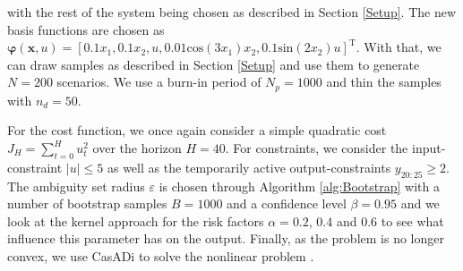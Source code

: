 with the rest of the system being chosen as described in Section \ref{Setup}. The new basis functions are chosen as $\boldsymbol{\varphi} (\boldsymbol{x}, u) = \left[0.1 x_1,  0.1 x_2,  u, 0.01 \text{cos} ( 3 x_1) x_2, 0.1 \text{sin} (2 x_2) u \right]^\text{T}$. With that, we can draw samples as described in Section \ref{Setup} and use them to generate $N = 200$ scenarios. We use a burn-in period of $N_p = 1000$ and thin the samples with $n_d = 50$.

For the cost function, we once again consider a simple quadratic cost $J_H = \sum_{t = 0}^H u_t^2$ over the horizon $H = 40$. For constraints, we consider the input-constraint $\left| u \right| \leq 5$ as well as the temporarily active output-constraints $y_{20:25} \geq 2$. The ambiguity set radius $\varepsilon$ is chosen through Algorithm \ref{alg:Bootstrap} with a number of bootstrap samples $B = 1000$ and a confidence level $\beta = 0.95$ and we look at the kernel approach for the risk factors $\alpha = 0.2$, $0.4$ and $0.6$ to see what influence this parameter has on the output. Finally, as the problem is no longer convex, we use CasADi to solve the nonlinear problem \cite{Andersson_19}.

